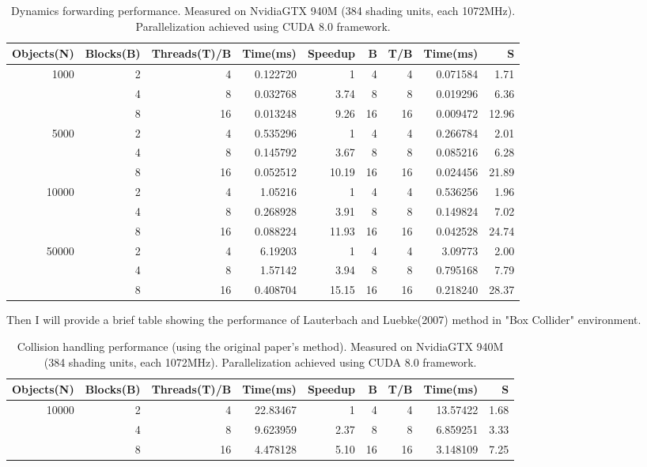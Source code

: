 \documentclass[11pt]{article}
\begin{document}
\begin{table}[htbp]
\centering
\begin{tabular}{rrrrrrrrr}
Objects(N) & Blocks(B) & Threads(T)/B & Time(ms) & Speedup & B & T/B & Time(ms) & S\\
\hline
1000 & 2 & 4 & 0.122720 & 1 & 4 & 4 & 0.071584 & 1.71\\
 & 4 & 8 & 0.032768 & 3.74 & 8 & 8 & 0.019296 & 6.36\\
 & 8 & 16 & 0.013248 & 9.26 & 16 & 16 & 0.009472 & 12.96\\
\hline
5000 & 2 & 4 & 0.535296 & 1 & 4 & 4 & 0.266784 & 2.01\\
 & 4 & 8 & 0.145792 & 3.67 & 8 & 8 & 0.085216 & 6.28\\
 & 8 & 16 & 0.052512 & 10.19 & 16 & 16 & 0.024456 & 21.89\\
\hline
10000 & 2 & 4 & 1.05216 & 1 & 4 & 4 & 0.536256 & 1.96\\
 & 4 & 8 & 0.268928 & 3.91 & 8 & 8 & 0.149824 & 7.02\\
 & 8 & 16 & 0.088224 & 11.93 & 16 & 16 & 0.042528 & 24.74\\
\hline
50000 & 2 & 4 & 6.19203 & 1 & 4 & 4 & 3.09773 & 2.00\\
 & 4 & 8 & 1.57142 & 3.94 & 8 & 8 & 0.795168 & 7.79\\
 & 8 & 16 & 0.408704 & 15.15 & 16 & 16 & 0.218240 & 28.37\\
\end{tabular}
\caption{Dynamics forwarding performance. Measured on Nvidia\textregistered GTX 940M (384 shading units, each 1072MHz). Parallelization achieved using CUDA 8.0 framework.}

\end{table}

Then I will provide a brief table showing the performance of Lauterbach and Luebke(2007) method in "Box Collider" environment.


\begin{table}[H]
\centering
\begin{tabular}{rrrrrrrrr}
Objects(N) & Blocks(B) & Threads(T)/B & Time(ms) & Speedup & B & T/B & Time(ms) & S\\
\hline
10000 & 2 & 4 & 22.83467 & 1 & 4 & 4 & 13.57422 & 1.68\\
 & 4 & 8 & 9.623959 & 2.37 & 8 & 8 & 6.859251 & 3.33\\
 & 8 & 16 & 4.478128 & 5.10 & 16 & 16 & 3.148109 & 7.25\\
\end{tabular}
\caption{Collision handling performance (using the original paper's method). Measured on Nvidia\textregistered GTX 940M (384 shading units, each 1072MHz). Parallelization achieved using CUDA 8.0 framework.}

\end{table}
\end{document}
